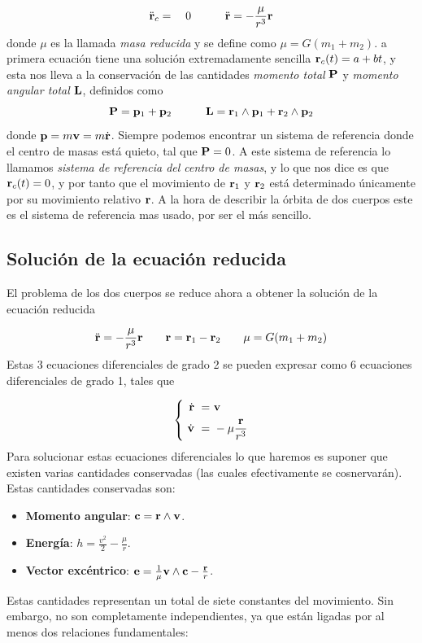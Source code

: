 \begin{equation}
	\ddot{\mathbf{r}}_c  =  \quad 0 \quad \quad \quad
	\ddot{\mathbf{r}}  = - \frac{\mu}{r^3} \mathbf{r}
\end{equation}
donde $\mu$ es la llamada \textit{masa reducida} y se define como $\mu = G (m_1+m_2)$. a primera ecuación tiene una solución extremadamente sencilla $\mathbf{r}_c(t)=a+bt$, y esta nos lleva a la conservación de las cantidades \textit{momento total} $\mathbf{P}$ y \textit{momento angular total} $\mathbf{L}$, definidos como
\begin{equation}
	\mathbf{P} = \mathbf{p}_1 + \mathbf{p}_2 \quad \quad \quad \mathbf{L} = \mathbf{r}_1 \wedge \mathbf{p}_1 + \mathbf{r}_2 \wedge \mathbf{p}_2
\end{equation}
donde $\mathbf{p}=m\mathbf{v}=m\dot{\mathbf{r}}$. Siempre podemos encontrar un sistema de referencia donde el centro de masas está quieto, tal que $\mathbf{P}=0$. A este sistema de referencia lo llamamos \textit{sistema de referencia del centro de masas}, y lo que nos dice es que $\mathbf{r}_c(t)=0$, y por tanto que el movimiento de $\mathbf{r}_1$ y $\mathbf{r}_2$ está determinado únicamente por su movimiento relativo $\mathbf{r}$. A la hora de describir la órbita de dos cuerpos este es el sistema de referencia mas usado, por ser el más sencillo.

\subsection{Solución de la ecuación reducida}

El problema de los dos cuerpos se reduce ahora a obtener la solución de la ecuación reducida

\begin{equation*}
	\ddot{\mathbf{r}} = - \frac{\mu}{r^3} \mathbf{r} \qquad \mathbf{r}=\mathbf{r}_1-\mathbf{r}_2 \qquad \mu=G(m_1+m_2)
\end{equation*}
Estas 3 ecuaciones diferenciales de grado 2 se pueden expresar como 6 ecuaciones diferenciales de grado 1, tales que

\begin{equation}
	\left\lbrace \
	\begin{split}
		\dot{\mathbf{r}} \ = \  & \mathbf{v}                   \\
		\dot{\mathbf{v}} \ = \  & - \mu \frac{\mathbf{r}}{r^3}
	\end{split}
	\right.
\end{equation}
Para solucionar estas ecuaciones diferenciales lo que haremos es suponer que existen varias cantidades conservadas (las cuales efectivamente se cosnervarán). Estas cantidades conservadas son:

\begin{itemize}
	\item \textbf{Momento angular}: $\mathbf{c}=\mathbf{r}\wedge\mathbf{v}$.
	\item \textbf{Energía}: $h=\frac{v^2}{2}-\frac{\mu}{r}$.
	\item \textbf{Vector excéntrico}: $\mathbf{e}=\frac{1}{\mu} \mathbf{v} \wedge \mathbf{c} - \frac{\mathbf{r}}{r}$.
\end{itemize}
Estas cantidades representan un total de siete constantes del movimiento. Sin embargo, no son completamente independientes, ya que están ligadas por al menos dos relaciones fundamentales:

